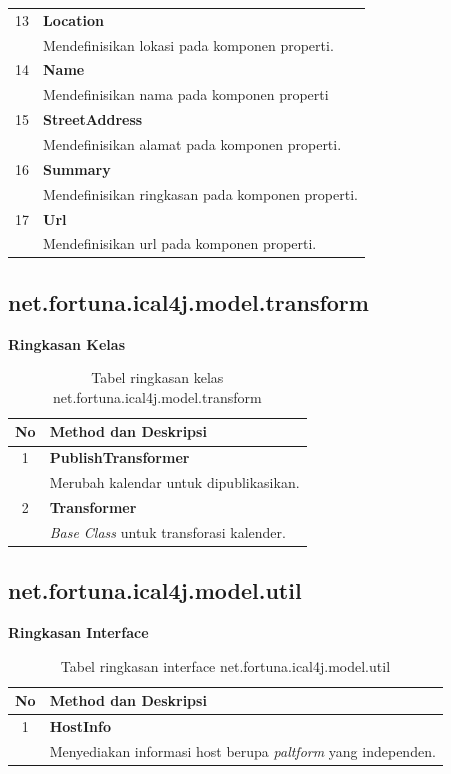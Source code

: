 \begin{table}[H]
\begin{longtable}{|c|p{12cm}|}
		13 & \textbf{Location}\\
			&	Mendefinisikan lokasi pada komponen properti.\\ \hline
		14 & \textbf{Name}\\
			&	Mendefinisikan nama pada komponen properti\\ \hline
		15 & \textbf{StreetAddress}\\
			&	Mendefinisikan alamat pada komponen properti.\\ \hline
		16 & \textbf{Summary}\\
			&	Mendefinisikan ringkasan pada komponen properti.\\ \hline
		17 & \textbf{Url}\\
			&	Mendefinisikan url pada komponen properti.\\ \hline
	\end{longtable}
\end{table}

\subsection{net.fortuna.ical4j.model.transform}
\label{subs:net.fortuna.ical4j.model.transform}
	\noindent \textbf{Ringkasan Kelas}\cite{ical}
	\begin{table}[H]
		\centering
		\caption{Tabel ringkasan kelas net.fortuna.ical4j.model.transform}
		\label{tab:kelas_net.fortuna.ical4j.model.transform}
	\begin{tabular}{|c|p{12cm}|}
		\hline
		\textbf{No} & \textbf{Method dan Deskripsi} \\ \hline \hline
		1 & \textbf{PublishTransformer}\\
			&	Merubah kalendar untuk dipublikasikan.\\ \hline
		2 & \textbf{Transformer}\\
			&	\textit{Base Class} untuk transforasi kalender. \\ \hline
		\end{tabular}
	\end{table}	
	
	\subsection{net.fortuna.ical4j.model.util}
\label{subs:net.fortuna.ical4j.model.util}
	\noindent \textbf{Ringkasan Interface}\cite{ical}
	\begin{table}[H]
		\centering
		\caption{Tabel ringkasan interface net.fortuna.ical4j.model.util}
		\label{tab:net.fortuna.ical4j.model.util}
	\begin{tabular}{|c|p{12cm}|}
		\hline
		\textbf{No} & \textbf{Method dan Deskripsi} \\ \hline \hline
		1 & \textbf{HostInfo}\\
			&	Menyediakan informasi host berupa \textit{paltform} yang independen.\\ \hline
	\end{tabular}
\end{table}


